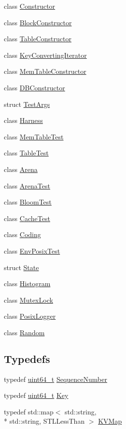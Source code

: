 \begin{DoxyCompactItemize}
\item 
class \hyperlink{classleveldb_1_1_constructor}{Constructor}
\item 
class \hyperlink{classleveldb_1_1_block_constructor}{Block\-Constructor}
\item 
class \hyperlink{classleveldb_1_1_table_constructor}{Table\-Constructor}
\item 
class \hyperlink{classleveldb_1_1_key_converting_iterator}{Key\-Converting\-Iterator}
\item 
class \hyperlink{classleveldb_1_1_mem_table_constructor}{Mem\-Table\-Constructor}
\item 
class \hyperlink{classleveldb_1_1_d_b_constructor}{D\-B\-Constructor}
\item 
struct \hyperlink{structleveldb_1_1_test_args}{Test\-Args}
\item 
class \hyperlink{classleveldb_1_1_harness}{Harness}
\item 
class \hyperlink{classleveldb_1_1_mem_table_test}{Mem\-Table\-Test}
\item 
class \hyperlink{classleveldb_1_1_table_test}{Table\-Test}
\item 
class \hyperlink{classleveldb_1_1_arena}{Arena}
\item 
class \hyperlink{classleveldb_1_1_arena_test}{Arena\-Test}
\item 
class \hyperlink{classleveldb_1_1_bloom_test}{Bloom\-Test}
\item 
class \hyperlink{classleveldb_1_1_cache_test}{Cache\-Test}
\item 
class \hyperlink{classleveldb_1_1_coding}{Coding}
\item 
class \hyperlink{classleveldb_1_1_env_posix_test}{Env\-Posix\-Test}
\item 
struct \hyperlink{structleveldb_1_1_state}{State}
\item 
class \hyperlink{classleveldb_1_1_histogram}{Histogram}
\item 
class \hyperlink{classleveldb_1_1_mutex_lock}{Mutex\-Lock}
\item 
class \hyperlink{classleveldb_1_1_posix_logger}{Posix\-Logger}
\item 
class \hyperlink{classleveldb_1_1_random}{Random}
\end{DoxyCompactItemize}
\subsection*{Typedefs}
\begin{DoxyCompactItemize}
\item 
typedef \hyperlink{stdint_8h_aaa5d1cd013383c889537491c3cfd9aad}{uint64\-\_\-t} \hyperlink{namespaceleveldb_a5481ededd221c36d652c371249f869fa}{Sequence\-Number}
\item 
typedef \hyperlink{stdint_8h_aaa5d1cd013383c889537491c3cfd9aad}{uint64\-\_\-t} \hyperlink{namespaceleveldb_a7e9a9725b13fa0bd922d885280dfab95}{Key}
\item 
typedef std\-::map$<$ std\-::string, \\*
std\-::string, S\-T\-L\-Less\-Than $>$ \hyperlink{namespaceleveldb_aac1e50450147be263e08252c6700f7a7}{K\-V\-Map}
\end{DoxyCompactItemize}
